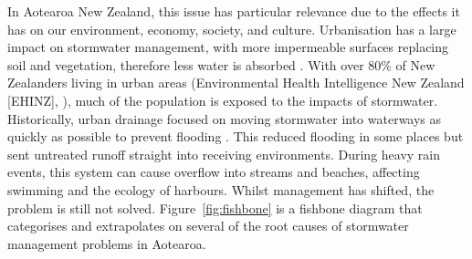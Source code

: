 \documentclass[11pt,a4paper]{article}
\begin{document}
In Aotearoa New Zealand, this issue has particular relevance due to the effects it has on our environment, economy, society, and culture. Urbanisation has a large impact on stormwater management, with more impermeable surfaces replacing soil and vegetation, therefore less water is absorbed \citep{esnz_intro}. With over 80\% of New Zealanders living in urban areas (Environmental Health Intelligence New Zealand [EHINZ], \citeyear{ehinz}), much of the population is exposed to the impacts of stormwater. Historically, urban drainage focused on moving stormwater into waterways as quickly as possible to prevent flooding \citep{navarrete}. This reduced flooding in some places but sent untreated runoff straight into receiving environments. During heavy rain events, this system can cause overflow into streams and beaches, affecting swimming and the ecology of harbours. Whilst management has shifted, the problem is still not solved. Figure~\ref{fig:fishbone} is a fishbone diagram that categorises and extrapolates on several of the root causes of stormwater management problems in Aotearoa.
\end{document}
